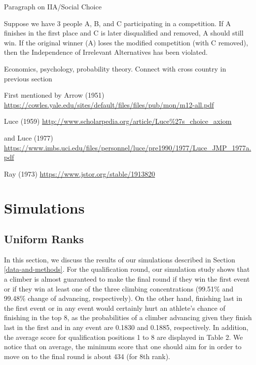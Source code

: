 \documentclass[12pt]{article}
\begin{document}
Paragraph on IIA/Social Choice

Suppose we have 3 people A, B, and C participating in a competition. If
A finishes in the first place and C is later disqualified and removed, A
should still win. If the original winner (A) loses the modified
competition (with C removed), then the Independence of Irrelevant
Alternatives has been violated.

Economics, psychology, probability theory. Connect with cross country in
previous section

First mentioned by Arrow (1951)
\url{https://cowles.yale.edu/sites/default/files/files/pub/mon/m12-all.pdf}

Luce (1959)
\url{http://www.scholarpedia.org/article/Luce\%27s_choice_axiom}

and Luce (1977)
\url{https://www.imbs.uci.edu/files/personnel/luce/pre1990/1977/Luce_JMP_1977a.pdf}

Ray (1973) \url{https://www.jstor.org/stable/1913820}

\hypertarget{simulations}{%
\section{Simulations}\label{simulations}}

\hypertarget{uniform-ranks}{%
\subsection{Uniform Ranks}\label{uniform-ranks}}

In this section, we discuss the results of our simulations described in
Section \ref{data-and-methods}. For the qualification round, our
simulation study shows that a climber is almost guaranteed to make the
final round if they win the first event or if they win at least one of
the three climbing concentrations (99.51\% and 99.48\% change of
advancing, respectively). On the other hand, finishing last in the first
event or in any event would certainly hurt an athlete's chance of
finishing in the top 8, as the probabilities of a climber advancing
given they finish last in the first and in any event are 0.1830 and
0.1885, respectively. In addition, the average score for qualification
positions 1 to 8 are displayed in Table 2. We notice that on average,
the minimum score that one should aim for in order to move on to the
final round is about 434 (for 8th rank).
\end{document}
